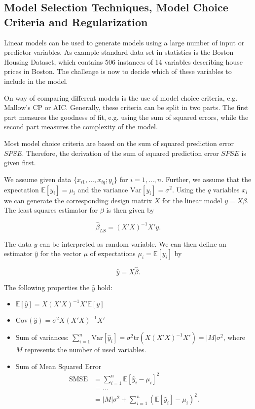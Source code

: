 \documentclass[10pt,a4paper]{article}
\begin{document}
\subsection{Model Selection Techniques, Model Choice Criteria and Regularization}

Linear models can be used to generate models using a large number of input or predictor variables.    As example standard data set in statistics is the Boston Housing Dataset, which contains 506 instances of 14 variables describing house prices in Boston. The challenge is now to decide which of these variables to include in the model. 

On way of comparing different models is the use of model choice criteria, e.g. Mallow's CP or AIC. Generally, these criteria can be split in two parts. The first part measures the goodness of fit, e.g. using the sum of squared errors, while the second part measures the complexity of the model. 

Most model choice criteria are based on the sum of squared prediction error $SPSE$. Therefore, the derivation of the sum of squared prediction error $SPSE$ is given first.

We assume given data $\{ x_{i1}, \dots, x_{iq}; y_i\}$ for $i =1, \dots, n$. Further, we assume that the expectation $\mathbb{E}[y_i] = \mu_i$ and the variance $\text{Var}[y_i] = \sigma^2$. Using the $q$ variables $x_i$ we can generate the corresponding design matrix $X$ for the linear model $y = X\beta$. The least squares estimator for $\beta$ is then given by

$$\hat \beta_{LS} = (X'X)^{-1}X'y.$$

The data $y$ can be interpreted as random variable. We can then define an estimator $\hat  y$ for the vector $\mu$ of expectations $\mu_i = \mathbb{E}[y_i]$ by

$$\hat  y = X \hat \beta.$$

The following properties the $\hat y$ hold:

\begin{itemize}
	\item $\mathbb{E} [\hat y] = X(X'X)^{-1}X'\mathbb{E}[y]$
	\item $\text{Cov}(\hat y) = \sigma^2 X(X'X)^{-1}X'$
	\item Sum of variances: $\sum_{i=1}^n \text{Var} [\hat y_i] = \sigma^2 \text{tr}(X(X'X)^{-1}X') = \vert M \vert \sigma^2$, where $M$ represents the number  of used variables.
	\item Sum of Mean Squared Error
		\begin{equation}  
		\begin{split} 
		\text{SMSE} &= \sum_{i=1}^n \mathbb{E}[\hat y_i - \mu_i]^2 \\
				    &= ...  \\
				    &= \vert M \vert\sigma^2 + \sum_{i=1}^n(\mathbb{E}[\hat y_i] - \mu_i)^2.
		\end{split}
		\end{equation}
\end{itemize}
\end{document}
